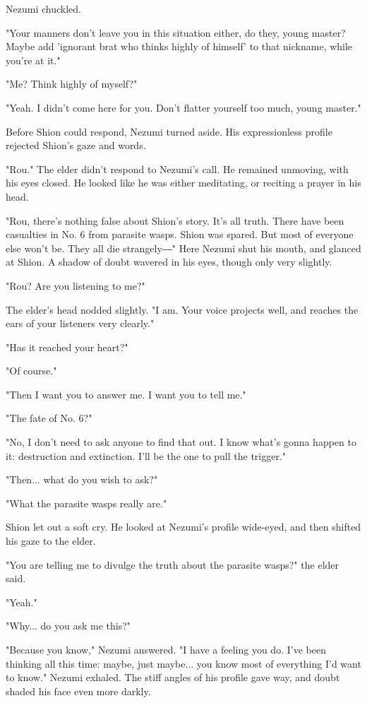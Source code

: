 Nezumi chuckled.

"Your manners don't leave you in this situation either, do they, young
master? Maybe add 'ignorant brat who thinks highly of himself' to that
nickname, while you're at it."

"Me? Think highly of myself?"

"Yeah. I didn't come here for you. Don't flatter yourself too much,
young master."

Before Shion could respond, Nezumi turned aside. His expressionless
profile rejected Shion's gaze and words.

"Rou." The elder didn't respond to Nezumi's call. He remained unmoving,
with his eyes closed. He looked like he was either meditating, or
reciting a prayer in his head.

"Rou, there's nothing false about Shion's story. It's all truth. There
have been casualties in No. 6 from parasite wasps. Shion was spared. But
most of everyone else won't be. They all die strangely―" Here Nezumi
shut his mouth, and glanced at Shion. A shadow of doubt wavered in his
eyes, though only very slightly.

"Rou? Are you listening to me?"

The elder's head nodded slightly. "I am. Your voice projects well, and
reaches the ears of your listeners very clearly."

"Has it reached your heart?"

"Of course."

"Then I want you to answer me. I want you to tell me."

"The fate of No. 6?"

"No, I don't need to ask anyone to find that out. I know what's gonna
happen to it: destruction and extinction. I'll be the one to pull the
trigger."

"Then... what do you wish to ask?"

"What the parasite wasps really are."

Shion let out a soft cry. He looked at Nezumi's profile wide-eyed, and
then shifted his gaze to the elder.

"You are telling me to divulge the truth about the parasite wasps?" the
elder said.

"Yeah."

"Why... do you ask me this?"

"Because you know," Nezumi answered. "I have a feeling you do. I've been
thinking all this time: maybe, just maybe... you know most of everything
I'd want to know." Nezumi exhaled. The stiff angles of his profile gave
way, and doubt shaded his face even more darkly.

